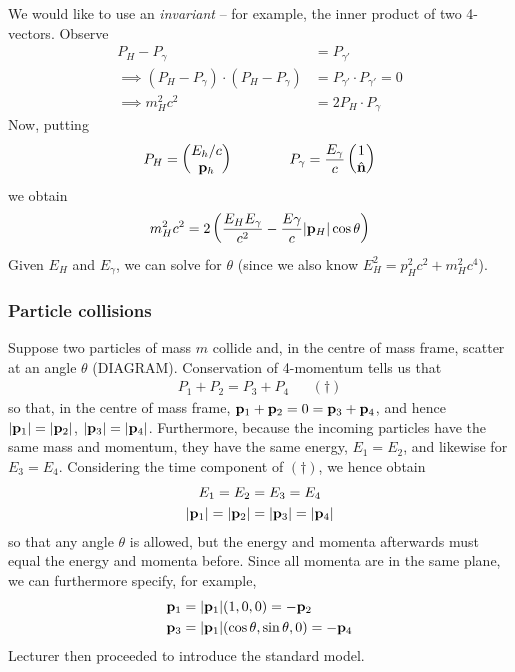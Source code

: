 \documentclass{../template/note}
\begin{document}
    We would like to use an \emph{invariant} -- for example, the inner product of two 4-vectors. Observe
    \begin{align*}
        P_H - P_{\gamma} &= P_{\gamma'} \\
        \implies (P_H-P_\gamma) \cdot (P_H-P_\gamma) &= P_{\gamma'} \cdot P_{\gamma'} = 0 \\
        \implies m_H^2c^2 &= 2P_H \cdot P_\gamma
    \end{align*}
    Now, putting
    \begin{align*}
        P_H = \begin{pmatrix}
            E_h/c \\
            \V p_h \\
        \end{pmatrix} \qquad \qquad P_\gamma = \frac{E_\gamma}{c} \begin{pmatrix}
            1 \\
            \hvec n \\
        \end{pmatrix}
    \end{align*}
    we obtain
    \begin{align*}
        m_H^2 c^2 = 2\left(\frac{E_HE_\gamma}{c^2} - \frac{E\gamma}{c} |\V p_H| \cos \theta\right)
    \end{align*}
    Given \(E_H\) and \(E_\gamma\), we can solve for \(\theta\) (since we also know \(E_H^2 = p_H^2 c^2 + m_H^2 c^4\)).

    \subsubsection{Particle collisions}

    Suppose two particles of mass \(m\) collide and, in the centre of mass frame, scatter at an angle \(\theta\) (DIAGRAM). Conservation of 4-momentum tells us that
    \begin{align*}
        P_1 + P_2 = P_3 + P_4 && (\dagger)
    \end{align*}
    so that, in the centre of mass frame, \(\V p_1 + \V p_2 = 0 = \V p_3 + \V p_4\), and hence \(|\V p_1| = |\V p_2|\), \(|\V p_3| = |\V p_4|\). Furthermore, because the incoming particles have the same mass and momentum, they have the same energy, \(E_1 = E_2\), and likewise for \(E_3 = E_4\). Considering the time component of \((\dagger)\), we hence obtain
    \begin{align*}
        E_1 = E_2 &= E_3 = E_4 \\
        |\V p_1| = |\V p_2| &= |\V p_3| = |\V p_4|
    \end{align*}
    so that any angle \(\theta\) is allowed, but the energy and momenta afterwards must equal the energy and momenta before. Since all momenta are in the same plane, we can furthermore specify, for example,
    \begin{align*}
        \V p_1 &= |\V p_1|(1, 0, 0) = -\V p_2 \\
        \V p_3 &= |\V p_1|(\cos \theta, \sin \theta, 0) = -\V p_4
    \end{align*}
    Lecturer then proceeded to introduce the standard model.
\end{document}
